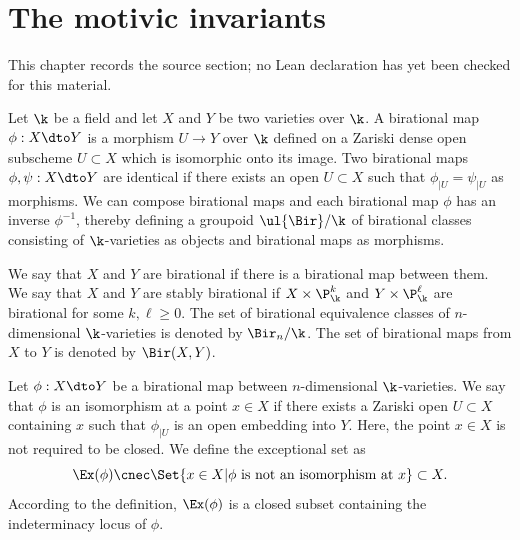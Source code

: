 \chapter{The motivic invariants}
\label{motivic-invariants-birational-maps-chapter-02}

\begin{remark}
\label{motivic-invariants-birational-maps-chapter-02-source}
This chapter records the source section; no Lean declaration has yet been checked for this material.
\notready
\end{remark}

\label{sec:invariants}





Let $\k$ be a field and
let $X$ and $Y$ be two varieties over $\k$.
A birational map $\phi : X \dto Y$
is a morphism $U \to Y$ over $\k$
defined on a Zariski dense open subscheme
$U \subset X$
which is isomorphic onto its image.
Two birational maps $\phi,\psi : X \dto Y$
are identical
if there exists an open
$U \subset X$ such that $\phi_{|U} = \psi_{|U}$
as morphisms.
We can compose birational maps and each
birational map $\phi$ has an inverse $\phi^{-1}$,
thereby defining a
groupoid $\ul{\Bir}/\k$ of birational classes
consisting of $\k$-varieties as objects
and birational maps as morphisms.

We say that $X$ and $Y$ are birational if there is a birational
map between them. We say that $X$ and $Y$ are stably
birational if $X \times \P_\k^k$ and $Y \times \P_\k^\ell$ are birational
for some $k, \ell \ge 0$.
The set of birational equivalence classes of
$n$-dimensional
$\k$-varieties
is denoted by $\Bir_n/\k$.
The set of birational maps
from $X$ to $Y$ is denoted by $\Bir(X,Y)$.

Let $\phi: X \dto Y$ be a birational map between
$n$-dimensional $\k$-varieties.
We say that $\phi$ is an isomorphism at a point
$x \in X$ if there exists a Zariski open $U \subset X$
containing $x$ such that
$\phi_{|U}$ is an open embedding into $Y$.
Here, the point $x \in X$ is not required to be closed.
We define the exceptional set as
$$\Ex(\phi) \cnec \Set{x \in X | \phi \text{ is not an isomorphism at } x} \subset X.$$
According to the definition, $\Ex(\phi)$ is a closed
subset
containing the indeterminacy locus of $\phi$.

